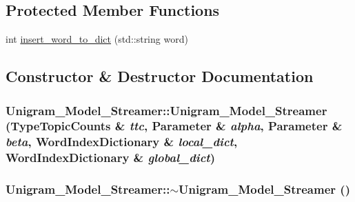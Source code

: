 \subsection*{Protected Member Functions}
\begin{DoxyCompactItemize}
\item 
int \hyperlink{class_unigram___model___streamer_a51a09e569da02b64cec4a551cc4f3ba0}{insert\_\-word\_\-to\_\-dict} (std::string word)
\end{DoxyCompactItemize}


\subsection{Constructor \& Destructor Documentation}
\hypertarget{class_unigram___model___streamer_a43e7f046831bcd22ac0b16fb6f39aacb}{
\subsubsection[{Unigram\_\-Model\_\-Streamer}]{\setlength{\rightskip}{0pt plus 5cm}Unigram\_\-Model\_\-Streamer::Unigram\_\-Model\_\-Streamer ({\bf TypeTopicCounts} \& {\em ttc}, \/  {\bf Parameter} \& {\em alpha}, \/  {\bf Parameter} \& {\em beta}, \/  {\bf WordIndexDictionary} \& {\em local\_\-dict}, \/  {\bf WordIndexDictionary} \& {\em global\_\-dict})}}
\label{class_unigram___model___streamer_a43e7f046831bcd22ac0b16fb6f39aacb}
\hypertarget{class_unigram___model___streamer_a80613d9c8c9a500875c3fadc5f0ea595}{
\subsubsection[{$\sim$Unigram\_\-Model\_\-Streamer}]{\setlength{\rightskip}{0pt plus 5cm}Unigram\_\-Model\_\-Streamer::$\sim$Unigram\_\-Model\_\-Streamer ()}}
\label{class_unigram___model___streamer_a80613d9c8c9a500875c3fadc5f0ea595}


